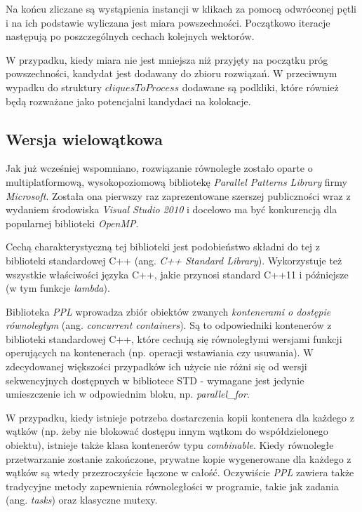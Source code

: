 \documentclass[12pt]{article}
\begin{document}
Na końcu zliczane są wystąpienia instancji w klikach za pomocą odwróconej pętli i na ich podstawie wyliczana jest miara powszechności. Początkowo iteracje następują po poszczególnych cechach kolejnych wektorów.

W przypadku, kiedy miara nie jest mniejsza niż przyjęty na początku próg powszechności, kandydat jest dodawany do zbioru rozwiązań. W przeciwnym wypadku do struktury $ cliquesToProcess $ dodawane są podkliki, które również będą rozważane jako potencjalni kandydaci na kolokacje.

\subsection{Wersja wielowątkowa}

Jak już wcześniej wspomniano, rozwiązanie równoległe zostało oparte o multiplatformową, wysokopoziomową bibliotekę \textit{Parallel Patterns Library} firmy \textit{Microsoft}. Została ona pierwszy raz zaprezentowane szerszej publiczności wraz z wydaniem środowiska \textit{Visual Studio 2010} i docelowo ma być konkurencją dla popularnej biblioteki \textit{OpenMP}. 

Cechą charakterystyczną tej biblioteki jest podobieństwo składni do tej z biblioteki standardowej C++ (ang. \textit{C++ Standard Library}). Wykorzystuje też wszystkie właściwości języka C++, jakie przynosi standard C++11 i późniejsze (w tym funkcje \textit{lambda}).

Biblioteka \textit{PPL} wprowadza zbiór obiektów zwanych \textit{kontenerami o dostępie równoległym} (ang. \textit{concurrent containers}). Są to odpowiedniki kontenerów z biblioteki standardowej C++, które cechują się równoległymi wersjami funkcji operujących na kontenerach (np. operacji wstawiania czy usuwania). W zdecydowanej większości przypadków ich użycie nie różni się od wersji sekwencyjnych dostępnych w bibliotece STD - wymagane jest jedynie umieszczenie ich w odpowiednim bloku, np. \textit{parallel\_for}. 

W przypadku, kiedy istnieje potrzeba dostarczenia kopii kontenera dla każdego z wątków (np. żeby nie blokować dostępu innym wątkom do współdzielonego obiektu), istnieje także klasa kontenerów typu \textit{combinable}. Kiedy równoległe przetwarzanie zostanie zakończone, prywatne kopie wygenerowane dla każdego z wątków są wtedy przezroczyście łączone w całość. Oczywiście \textit{PPL} zawiera także tradycyjne metody zapewnienia równoległości w programie, takie jak zadania (ang. \textit{tasks}) oraz klasyczne mutexy.
\end{document}
